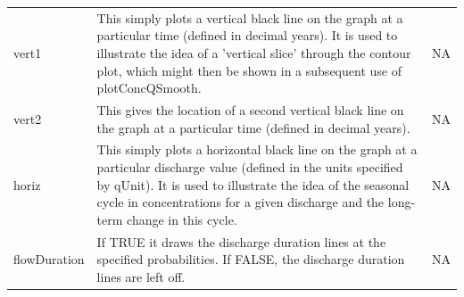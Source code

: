 \documentclass[a4paper,11pt]{article}\usepackage[]{graphicx}\usepackage[]{color}
\begin{document}
\begin{table}[ht]
\begin{tabularx}{\textwidth}{lXl}
vert1 & This simply plots a vertical black line on the graph at a particular time (defined in decimal years).  It is used to illustrate the idea of a 'vertical slice' through the contour plot, which might then be shown in a subsequent use of plotConcQSmooth. & NA  \\
vert2 & This gives the location of a second vertical black line on the graph at a particular time (defined in decimal years). & NA\\
horiz & This simply plots a horizontal black line on the graph at a particular discharge value (defined in the units specified by qUnit).  It is used to illustrate the idea of the seasonal cycle in concentrations for a given discharge and the long-term change in this cycle.  & NA\\
flowDuration & If TRUE it draws the discharge duration lines at the specified probabilities.  If FALSE, the discharge duration lines are left off. & NA\\
\hline
\end{tabularx}

\end{table}
\end{document}
